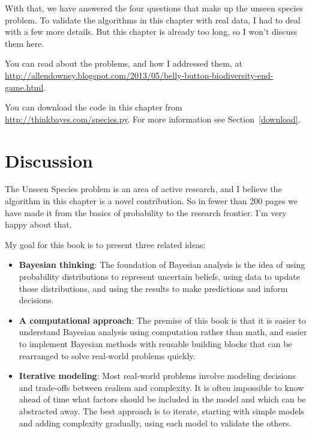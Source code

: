 \documentclass[12pt]{book}
\theoremstyle{exercise}
\begin{document}
With that, we have answered the four questions that make up the unseen
species problem.  To validate the algorithms in this chapter with
real data, I had to deal with a few more details.  But
this chapter is already too long, so I won't discuss them here.

You can read about the problems, and how I addressed them, at
\url{http://allendowney.blogspot.com/2013/05/belly-button-biodiversity-end-game.html}.

You can download the code in this chapter from
\url{http://thinkbayes.com/species.py}.
  For more information
see Section~\ref{download}.


\section{Discussion}

The Unseen Species problem is an area of active research, and I
believe the algorithm in this chapter is a novel contribution.  So in
fewer than 200 pages we have made it from the basics of probability to
the research frontier.  I'm very happy about that.

My goal for this book is to present three related ideas:

\begin{itemize}

\item {\bf Bayesian thinking}: The foundation of Bayesian analysis is
  the idea of using probability distributions to represent uncertain
  beliefs, using data to update those distributions, and using the
  results to make predictions and inform decisions.

\item {\bf A computational approach}: The premise of this book is that
  it is easier to understand Bayesian analysis using computation
  rather than math, and easier to implement Bayesian methods with
  reusable building blocks that can be rearranged to solve real-world
  problems quickly.

\item {\bf Iterative modeling}: Most real-world problems involve
  modeling decisions and trade-offs between realism and complexity.
  It is often impossible to know ahead of time what factors should be
  included in the model and which can be abstracted away.  The best
  approach is to iterate, starting with simple models and adding
  complexity gradually, using each model to validate the others.

\end{itemize}
\end{document}
